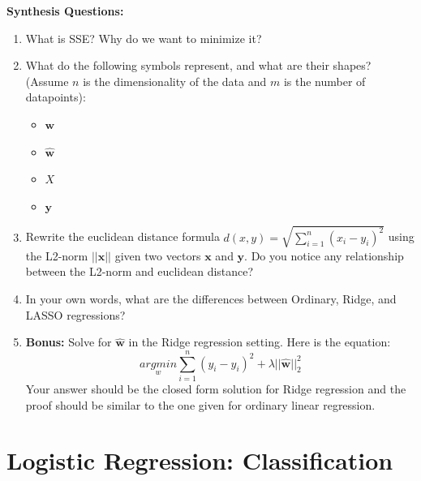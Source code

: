 \begin{questionbox}
\textbf{Synthesis Questions:}
\begin{enumerate}
    \item What is SSE? Why do we want to minimize it?
    \item What do the following symbols represent, and what are their shapes? (Assume $n$ is the dimensionality of the data and $m$ is the number of datapoints):
    \begin{itemize}
        \item $\textbf{w}$
        \item $\hat{\textbf{w}}$
        \item $X$
        \item $\textbf{y}$
    \end{itemize}
    \item Rewrite the euclidean distance formula $d(x,y) = \sqrt{\sum_{i=1}^n (x_i-y_i)^2}$ using the L2-norm $||\textbf{x}||$ given two vectors $\textbf{x}$ and $\textbf{y}$. Do you notice any relationship between the L2-norm and euclidean distance?
    \item In your own words, what are the differences between Ordinary, Ridge, and LASSO regressions?
    \item \textbf{Bonus:} Solve for $\hat{\textbf{w}}$ in the Ridge regression setting. Here is the equation: $$\underset{w}{argmin} \sum_{i=1}^n (y_i - \hat{y}_i)^2 + \lambda||\hat{\textbf{w}}||_2^2$$ Your answer should be the closed form solution for Ridge regression and the proof should be similar to the one given for ordinary linear regression.
\end{enumerate}
\end{questionbox}

\section{Logistic Regression: Classification}
